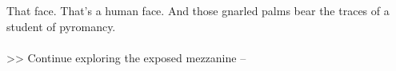 That face. That’s a human face. And those gnarled palms bear the traces of a student of pyromancy.\\
\\

>> Continue exploring the exposed mezzanine -- 